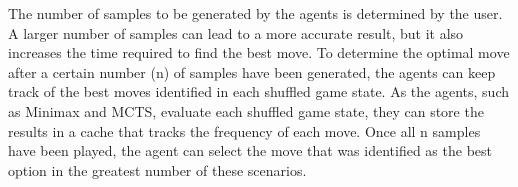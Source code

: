 The number of samples to be generated by the agents is determined by the user. A larger number of samples can lead to a more accurate result, but it also increases the time required to find the best move. To determine the optimal move after a certain number (n) of samples have been generated, the agents can keep track of the best moves identified in each shuffled game state. As the agents, such as Minimax and MCTS, evaluate each shuffled game state, they can store the results in a cache that tracks the frequency of each move. Once all n samples have been played, the agent can select the move that was identified as the best option in the greatest number of these scenarios.







